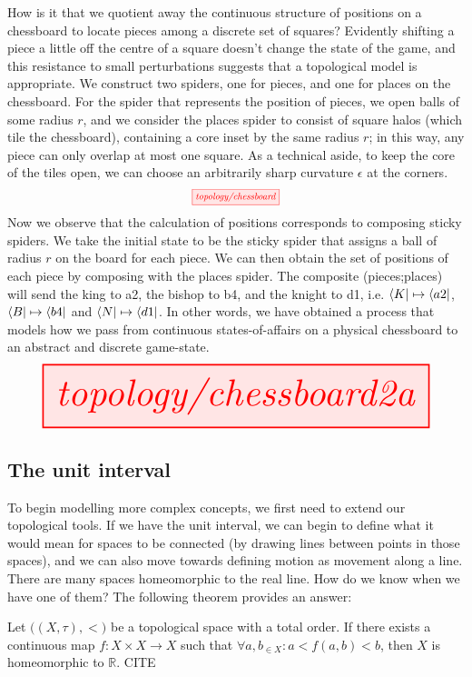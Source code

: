\begin{example}\label{ex:chessboard}
How is it that we quotient away the continuous structure of positions on a chessboard to locate pieces among a discrete set of squares? Evidently shifting a piece a little off the centre of a square doesn't change the state of the game, and this resistance to small perturbations suggests that a topological model is appropriate. We construct two spiders, one for pieces, and one for places on the chessboard. For the spider that represents the position of pieces, we open balls of some radius $r$, and we consider the places spider to consist of square halos (which tile the chessboard), containing a core inset by the same radius $r$; in this way, any piece can only overlap at most one square. As a technical aside, to keep the core of the tiles open, we can choose an arbitrarily sharp curvature $\epsilon$ at the corners.
\[\scalebox{0.75}{\tikzfig{topology/chessboard}}\]
Now we observe that the calculation of positions corresponds to composing sticky spiders. We take the initial state to be the sticky spider that assigns a ball of radius $r$ on the board for each piece. We can then obtain the set of positions of each piece by composing with the places spider. The composite (pieces;places)
will send the king to a2, the bishop to b4, and the knight to d1, i.e. $\bra{K} \mapsto \bra{a2}$, $\bra{B} \mapsto \bra{b4}$ and $\bra{N} \mapsto \bra{d1}$. In other words, we have obtained a process that models how we pass from continuous states-of-affairs on a physical chessboard to an abstract and discrete game-state.
\[\resizebox{\textwidth}{!}{\tikzfig{topology/chessboard2a}}\]
\end{example}
\newpage

\subsection{The unit interval}\label{sec:interval}
To begin modelling more complex concepts, we first need to extend our topological tools. If we have the unit interval, we can begin to define what it would mean for spaces to be connected (by drawing lines between points in those spaces), and we can also move towards defining motion as movement along a line. There are many spaces homeomorphic to the real line. How do we know when we have one of them? The following theorem provides an answer:
\begin{theorem}[Friedman]\label{thm:Friedman}
Let $\big((X,\tau), < \big)$ be a topological space with a total order. If there exists a continuous map $f: X \times X \rightarrow X$ such that $\forall a,b_{\in X} : a < f(a,b) < b$, then $X$ is homeomorphic to $\mathbb{R}$.
\bR CITE \e
\end{theorem}

